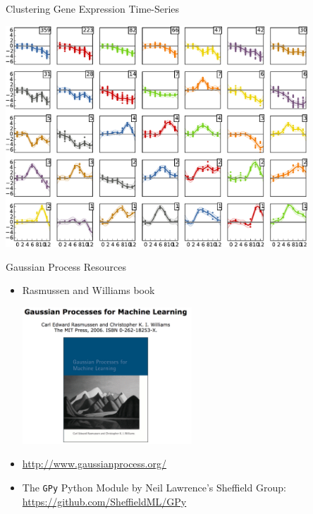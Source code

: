 \documentclass[pdf]{beamer}
\begin{document}
\begin{frame}{Clustering Gene Expression Time-Series}
\begin{center}
	\includegraphics[width=0.85\textwidth]{ProbeClustering.pdf}
\end{center}
\end{frame}

\begin{frame}{Gaussian Process Resources}
\begin{itemize}\addtolength{\itemsep}{0.3\baselineskip}
	\item Rasmussen and Williams book
	\begin{center}
		\includegraphics[width=0.5\textwidth]{GPBook.png}
	\end{center}
	\item \href{http://www.gaussianprocess.org/}{http://www.gaussianprocess.org/}
	\item The \texttt{GPy} Python Module by Neil Lawrence's Sheffield Group:\\ 
	\href{https://github.com/SheffieldML/GPy}{https://github.com/SheffieldML/GPy}
\end{itemize}
\end{frame}

\end{document}
